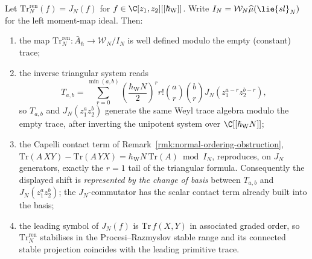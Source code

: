 \documentclass[11pt]{memoir}
\begin{document}
\begin{lem}\label{lem:capelli-renormalized-stable-trace}
  Let $\mathrm{Tr}^{\mathrm{ren}}_N(f)=J_N(f)$ for
  \(f\in\C[z_1,z_2][[\hbar_{\mathrm{W}}]]\). Write
  $I_N=\mathcal W_N\widehat\mu(\lie{sl}_N)$ for the left moment-map ideal.
  Then:
  \begin{enumerate}
    \item the map
      $\mathrm{Tr}^{\mathrm{ren}}_N\colon\bar A_\hbar
        \longrightarrow\mathcal W_N/I_N$
      is well defined modulo the empty (constant) trace;
    \item the inverse triangular system reads
      $$T_{a,b}=\sum_{r=0}^{\min(a,b)}
          \left(\frac{\hbar_{\mathrm{W}}N}{2}\right)^r r!\binom{a}{r}\binom{b}{r}
          J_N(z_1^{a-r}z_2^{b-r}),$$
      so $T_{a,b}$ and $J_N(z_1^az_2^b)$ generate the same Weyl trace
      algebra modulo the empty trace, after inverting the unipotent system
      over $\C[[\hbar_{\mathrm{W}}N]]$;
    \item the Capelli contact term of
      Remark~\ref{rmk:normal-ordering-obstruction},
      $\mathrm{Tr}(A\,XY)-\mathrm{Tr}(A\,YX)
        =\hbar_{\mathrm{W}}N\,\mathrm{Tr}(A)\bmod I_N$, reproduces, on $J_N$
      generators, exactly the $r=1$ tail of the triangular formula.
      Consequently the displayed shift is \emph{represented by the
      change of basis} between $T_{a,b}$ and $J_N(z_1^az_2^b)$; the
      \(J_N\)-commutator has the scalar contact term already built into
      the basis;
	    \item the leading symbol of $J_N(f)$ is $\mathrm{Tr}\,f(X,Y)$ in
	      associated graded order, so $\mathrm{Tr}^{\mathrm{ren}}_N$ stabilises
	      in the Procesi--Razmyslov stable range and its connected stable
	      projection coincides
	      with the leading primitive trace.
  \end{enumerate}
\end{lem}
\end{document}
